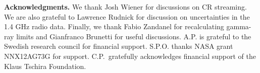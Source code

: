 \documentclass[useAMS,usenatbib]{mn2e}
\begin{document}
{\bf Acknowledgments.} We thank Josh Wiener for discussions on CR
streaming. We are also grateful to Lawrence Rudnick for discussion on
uncertainties in the 1.4 GHz radio data. Finally, we thank Fabio
Zandanel for recalculating gamma-ray limits and Gianfranco Brunetti
for useful discussions. A.P. is grateful to the Swedish research
council for financial support. S.P.O. thanks NASA grant NNX12AG73G for
support. C.P.~gratefully acknowledges financial support of the Klaus
Tschira Foundation.
\vspace{-0.7cm}



\end{document}
